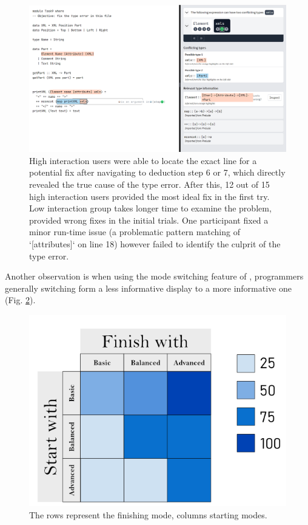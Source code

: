 \begin{figure}[h]
    \centering
    \includegraphics[width=\linewidth]{images/r4-task9.png}
    \caption{
High interaction users were able to locate the exact line for a potential fix after navigating to deduction step 6 or 7, which directly revealed the true cause of the type error. After this, 12 out of 15 high interaction users provided the most ideal fix in the first try. Low interaction group  takes longer time to examine the problem, provided wrong fixes in the initial trials. One participant fixed a minor run-time issue (a problematic pattern matching of `[attributes]` on line 18) however failed to identify the culprit of the type error.
    }
    \label{fig:r4-task9}
\end{figure}


Another observation is when using the mode switching feature of \chameleon{}, programmers generally switching form a less informative display to a more informative one (Fig. \ref{fig:r4-mode-switching}). 

\begin{figure}[h]
    \centering
    \includegraphics[width=\linewidth]{images/r4-mode-switching.png}
    \caption{
        The rows represent the finishing mode, columns starting modes.
    }
    \label{fig:r4-mode-switching}
\end{figure}


